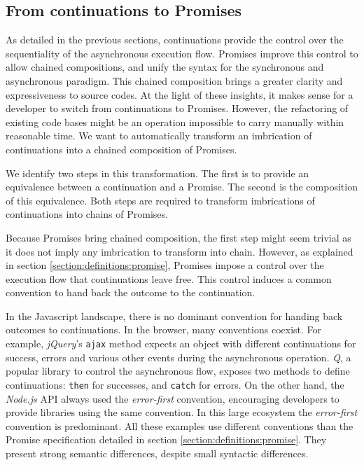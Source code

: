 \subsection{From continuations to Promises} \label{seciton:definitions:analysis}

As detailed in the previous sections, continuations provide the control over the sequentiality of the asynchronous execution flow.
Promises improve this control to allow chained compositions, and unify the syntax for the synchronous and asynchronous paradigm.
This chained composition brings a greater clarity and expressiveness to source codes.
At the light of these insights, it makes sense for a developer to switch from continuations to Promises.
However, the refactoring of existing code bases might be an operation impossible to carry manually within reasonable time.
We want to automatically transform an imbrication of continuations into a chained composition of Promises.

We identify two steps in this transformation.
The first is to provide an equivalence between a continuation and a Promise.
The second is the composition of this equivalence.
Both steps are required to transform imbrications of continuations into chains of Promises.

Because Promises bring chained composition, the first step might seem trivial as it does not imply any imbrication to transform into chain.
However, as explained in section \ref{section:definitions:promise}, Promises impose a control over the execution flow that continuations leave free.
This control induces a common convention to hand back the outcome to the continuation.

In the Javascript landscape, there is no dominant convention for handing back outcomes to continuations.
In the browser, many conventions coexist.
For example, \textit{jQuery}'s \texttt{ajax} method expects an object with different continuations for success, errors and various other events during the asynchronous operation.
\textit{Q}, a popular library to control the asynchronous flow, exposes two methods to define continuations: \texttt{then} for successes, and \texttt{catch} for errors.
On the other hand, the \textit{Node.js} API always used the \textit{error-first} convention, encouraging developers to provide libraries using the same convention.
In this large ecosystem the \textit{error-first} convention is predominant.
All these examples use different conventions than the Promise specification detailed in section \ref{section:definitions:promise}.
They present strong semantic differences, despite small syntactic differences.

